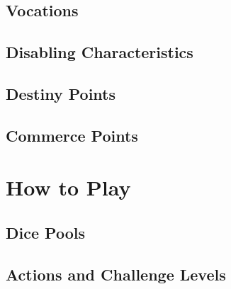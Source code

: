 \newpage
\chapter{Vocations} \label{ch:cc_vocations}


\newpage
\chapter{Disabling Characteristics} \label{ch:cc_disabling_characteristics}


\newpage
\chapter{Destiny Points} \label{ch:cc_destiny_points}


\newpage
\chapter{Commerce Points} \label{ch:cc_commerce_points}


\part{How to Play} \label{part:how_to_play}

\newpage
\chapter{Dice Pools} \label{ch:hp_dice_pools}


\newpage
\chapter{Actions and Challenge Levels} \label{ch:hp_challenge_levels}



